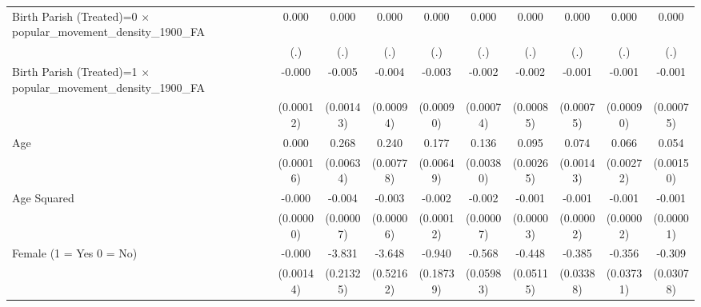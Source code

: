{\begin{tabular}{l*{9}{c}}
Birth Parish (Treated)=0 $\times$ popular\_movement\_density\_1900\_FA&       0.000         &       0.000         &       0.000         &       0.000         &       0.000         &       0.000         &       0.000         &       0.000         &       0.000         \\
                    &         (.)         &         (.)         &         (.)         &         (.)         &         (.)         &         (.)         &         (.)         &         (.)         &         (.)         \\
Birth Parish (Treated)=1 $\times$ popular\_movement\_density\_1900\_FA&      -0.000         &      -0.005\sym{***}&      -0.004\sym{***}&      -0.003\sym{**} &      -0.002\sym{**} &      -0.002\sym{*}  &      -0.001         &      -0.001         &      -0.001         \\
                    &   (0.00012)         &   (0.00143)         &   (0.00094)         &   (0.00090)         &   (0.00074)         &   (0.00085)         &   (0.00075)         &   (0.00090)         &   (0.00075)         \\
Age                 &       0.000         &       0.268\sym{***}&       0.240\sym{***}&       0.177\sym{***}&       0.136\sym{***}&       0.095\sym{***}&       0.074\sym{***}&       0.066\sym{***}&       0.054\sym{***}\\
                    &   (0.00016)         &   (0.00634)         &   (0.00778)         &   (0.00649)         &   (0.00380)         &   (0.00265)         &   (0.00143)         &   (0.00272)         &   (0.00150)         \\
Age Squared         &      -0.000         &      -0.004\sym{***}&      -0.003\sym{***}&      -0.002\sym{***}&      -0.002\sym{***}&      -0.001\sym{***}&      -0.001\sym{***}&      -0.001\sym{***}&      -0.001\sym{***}\\
                    &   (0.00000)         &   (0.00007)         &   (0.00006)         &   (0.00012)         &   (0.00007)         &   (0.00003)         &   (0.00002)         &   (0.00002)         &   (0.00001)         \\
Female (1 = Yes 0 = No)&      -0.000         &      -3.831\sym{***}&      -3.648\sym{***}&      -0.940\sym{***}&      -0.568\sym{***}&      -0.448\sym{***}&      -0.385\sym{***}&      -0.356\sym{***}&      -0.309\sym{***}\\
                    &   (0.00144)         &   (0.21325)         &   (0.52162)         &   (0.18739)         &   (0.05983)         &   (0.05115)         &   (0.03388)         &   (0.03731)         &   (0.03078)         \\

\end{tabular}}
